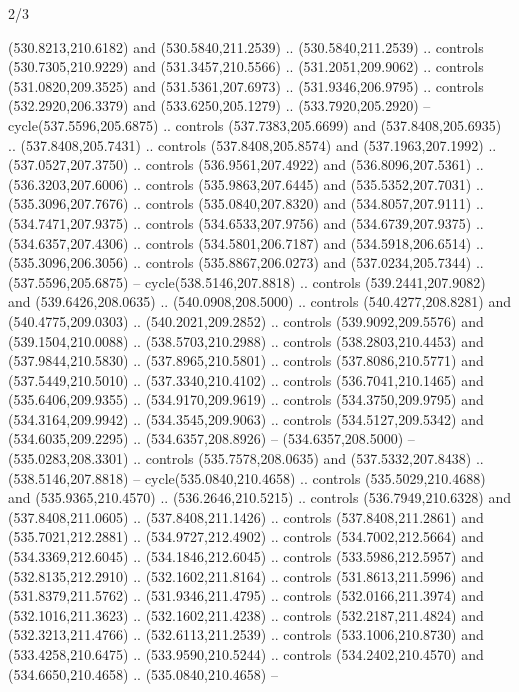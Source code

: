 \begin{flagdescription}{2/3}
\begin{scope}[xshift=0.5\flaglength,yshift=0.5\flagwidth,scale=\flagwidth/495.65]
\begin{scope}[y=0.8pt, x=0.8pt, yscale=-1,shift={(-463.76,-309.78)}]
  (530.8213,210.6182) and (530.5840,211.2539) .. (530.5840,211.2539) .. controls
  (530.7305,210.9229) and (531.3457,210.5566) .. (531.2051,209.9062) .. controls
  (531.0820,209.3525) and (531.5361,207.6973) .. (531.9346,206.9795) .. controls
  (532.2920,206.3379) and (533.6250,205.1279) .. (533.7920,205.2920) --
  cycle(537.5596,205.6875) .. controls (537.7383,205.6699) and
  (537.8408,205.6935) .. (537.8408,205.7431) .. controls (537.8408,205.8574) and
  (537.1963,207.1992) .. (537.0527,207.3750) .. controls (536.9561,207.4922) and
  (536.8096,207.5361) .. (536.3203,207.6006) .. controls (535.9863,207.6445) and
  (535.5352,207.7031) .. (535.3096,207.7676) .. controls (535.0840,207.8320) and
  (534.8057,207.9111) .. (534.7471,207.9375) .. controls (534.6533,207.9756) and
  (534.6739,207.9375) .. (534.6357,207.4306) .. controls (534.5801,206.7187) and
  (534.5918,206.6514) .. (535.3096,206.3056) .. controls (535.8867,206.0273) and
  (537.0234,205.7344) .. (537.5596,205.6875) -- cycle(538.5146,207.8818) ..
  controls (539.2441,207.9082) and (539.6426,208.0635) .. (540.0908,208.5000) ..
  controls (540.4277,208.8281) and (540.4775,209.0303) .. (540.2021,209.2852) ..
  controls (539.9092,209.5576) and (539.1504,210.0088) .. (538.5703,210.2988) ..
  controls (538.2803,210.4453) and (537.9844,210.5830) .. (537.8965,210.5801) ..
  controls (537.8086,210.5771) and (537.5449,210.5010) .. (537.3340,210.4102) ..
  controls (536.7041,210.1465) and (535.6406,209.9355) .. (534.9170,209.9619) ..
  controls (534.3750,209.9795) and (534.3164,209.9942) .. (534.3545,209.9063) ..
  controls (534.5127,209.5342) and (534.6035,209.2295) .. (534.6357,208.8926) --
  (534.6357,208.5000) -- (535.0283,208.3301) .. controls (535.7578,208.0635) and
  (537.5332,207.8438) .. (538.5146,207.8818) -- cycle(535.0840,210.4658) ..
  controls (535.5029,210.4688) and (535.9365,210.4570) .. (536.2646,210.5215) ..
  controls (536.7949,210.6328) and (537.8408,211.0605) .. (537.8408,211.1426) ..
  controls (537.8408,211.2861) and (535.7021,212.2881) .. (534.9727,212.4902) ..
  controls (534.7002,212.5664) and (534.3369,212.6045) .. (534.1846,212.6045) ..
  controls (533.5986,212.5957) and (532.8135,212.2910) .. (532.1602,211.8164) ..
  controls (531.8613,211.5996) and (531.8379,211.5762) .. (531.9346,211.4795) ..
  controls (532.0166,211.3974) and (532.1016,211.3623) .. (532.1602,211.4238) ..
  controls (532.2187,211.4824) and (532.3213,211.4766) .. (532.6113,211.2539) ..
  controls (533.1006,210.8730) and (533.4258,210.6475) .. (533.9590,210.5244) ..
  controls (534.2402,210.4570) and (534.6650,210.4658) .. (535.0840,210.4658) --

\end{scope}
\end{scope}
\end{flagdescription}
